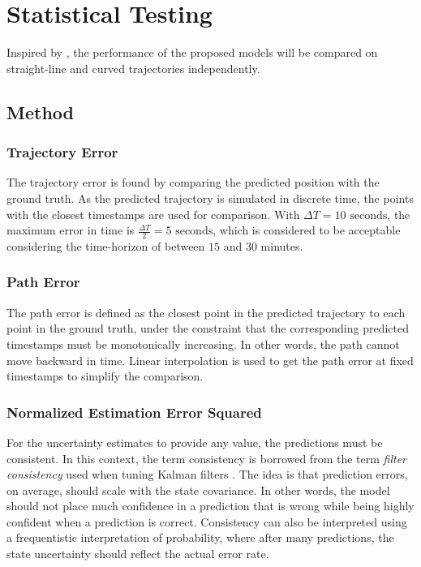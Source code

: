 \chapter{Statistical Testing}\label{chap:stat_testing}
Inspired by \cite{hexeberg}, the performance of the proposed models will be compared on straight-line and curved trajectories independently.

\section{Method}



\subsection{Trajectory Error}
The trajectory error is found by comparing the predicted position with the ground truth. As the predicted trajectory is simulated in discrete time, the points with the closest timestamps are used for comparison. With $\Delta T = 10\text{ seconds}$, the maximum error in time is $\frac{\Delta T}{2} = 5 \text{ seconds}$, which is considered to be acceptable considering the time-horizon of between $15$ and $30$ minutes.
\subsection{Path Error}
The path error is defined as the closest point in the predicted trajectory to each point in the ground truth, under the constraint that the corresponding predicted timestamps must be monotonically increasing. In other words, the path cannot move backward in time. Linear interpolation is used to get the path error at fixed timestamps to simplify the comparison.

\subsection{Normalized Estimation Error Squared}
For the uncertainty estimates to provide any value, the predictions must be consistent. In this context, the term consistency is borrowed from the term \textit{filter consistency} used when tuning Kalman filters \cite{sensorfusjon}. The idea is that prediction errors, on average, should scale with the state covariance. In other words, the model should not place much confidence in a prediction that is wrong while being highly confident when a prediction is correct. Consistency can also be interpreted using a frequentistic interpretation of probability, where after many predictions, the state uncertainty should reflect the actual error rate.

